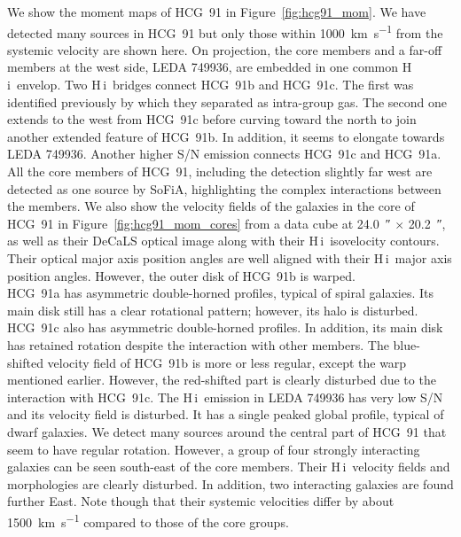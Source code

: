 \documentclass{aa}
\newcommand{\HI}{H\,{\sc i}}
\begin{document}
We show the moment maps of HCG~91 in Figure~\ref{fig:hcg91_mom}. We have detected many sources in HCG~91 but only those within \qty{1000}{km~s^{-1}} from the systemic velocity are shown here. 
On projection, the core members and a far-off members at the west side, LEDA 749936, are embedded 
in one common \HI\ envelop. Two \HI\ bridges connect HCG~91b and HCG~91c. The first was identified previously by \citet{2023A&A...670A..21J} which they separated as intra-group gas. 
The second one extends to the west from HCG~91c before curving toward the north to join another extended feature of HCG~91b. In addition, it seems to elongate towards LEDA 749936. 
Another higher S/N emission connects HCG~91c and HCG~91a. All the core members of HCG~91, including the detection slightly far west are detected as one source by SoFiA, highlighting 
the complex interactions between the members. We also show the velocity fields of the galaxies in the core of HCG~91 in Figure~\ref{fig:hcg91_mom_cores} from a data cube 
at \SI{24.0}{\arcsecond} $\times$ \SI{20.2}{\arcsecond}, as well as their DeCaLS optical image along with their \HI\ isovelocity contours. Their optical major axis position angles are 
well aligned with their \HI\ major axis position angles. However, the outer disk of HCG~91b is warped. \\
HCG~91a has asymmetric double-horned profiles, typical of spiral galaxies. Its main disk still has a clear rotational pattern; however, 
its halo is disturbed. HCG~91c also has asymmetric double-horned profiles. In addition, its main disk has retained rotation despite the interaction with other members. The blue-shifted 
velocity field of HCG~91b is more or less regular, except the warp mentioned earlier. However, the red-shifted part is clearly disturbed due to the interaction with HCG~91c. The \HI\ emission in LEDA 749936 has 
very low S/N and its velocity field is disturbed. It has a single peaked global profile, typical of dwarf galaxies.  We detect many sources around the central part of HCG~91 that seem to 
have regular rotation. However, a group of four strongly interacting galaxies can be seen south-east of the core members. Their \HI\ velocity fields and morphologies are clearly disturbed. 
In addition, two interacting galaxies are found further East. Note though that their systemic velocities differ by about \qty{1500}{km~s^{-1}} compared to those of the core groups.   
        
\end{document}
